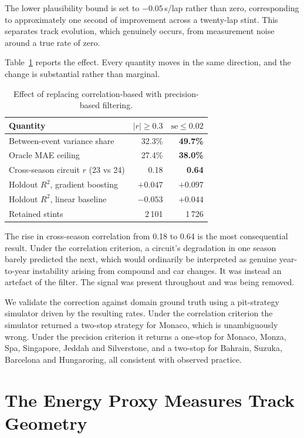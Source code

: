 \documentclass[conference]{IEEEtran}
\begin{document}
The lower plausibility bound is set to $-0.05$\,s/lap rather than zero,
corresponding to approximately one second of improvement across a
twenty-lap stint. This separates track evolution, which genuinely occurs, from
measurement noise around a true rate of zero.

Table~\ref{tab:effect} reports the effect. Every quantity moves in the same
direction, and the change is substantial rather than marginal.

\begin{table}[t]
\caption{Effect of replacing correlation-based with precision-based filtering.}
\label{tab:effect}
\centering
\begin{tabular}{lrr}
\toprule
Quantity & $|r| \geq 0.3$ & $\mathrm{se} \leq 0.02$ \\
\midrule
Between-event variance share & 32.3\% & \textbf{49.7\%} \\
Oracle MAE ceiling & 27.4\% & \textbf{38.0\%} \\
Cross-season circuit $r$ (23 vs 24) & 0.18 & \textbf{0.64} \\
Holdout $R^2$, gradient boosting & $+0.047$ & \textbf{$+0.097$} \\
Holdout $R^2$, linear baseline & $-0.053$ & \textbf{$+0.044$} \\
Retained stints & 2\,101 & 1\,726 \\
\bottomrule
\end{tabular}
\end{table}

The rise in cross-season correlation from 0.18 to 0.64 is the most consequential
result. Under the correlation criterion, a circuit's degradation in one season
barely predicted the next, which would ordinarily be interpreted as genuine
year-to-year instability arising from compound and car changes. It was instead
an artefact of the filter. The signal was present throughout and was being
removed.

We validate the correction against domain ground truth using a pit-strategy
simulator driven by the resulting rates. Under the correlation criterion the
simulator returned a two-stop strategy for Monaco, which is unambiguously
wrong. Under the precision criterion it returns a one-stop for Monaco, Monza,
Spa, Singapore, Jeddah and Silverstone, and a two-stop for Bahrain, Suzuka,
Barcelona and Hungaroring, all consistent with observed practice.

\section{The Energy Proxy Measures Track Geometry}
\label{sec:energy}
\end{document}

